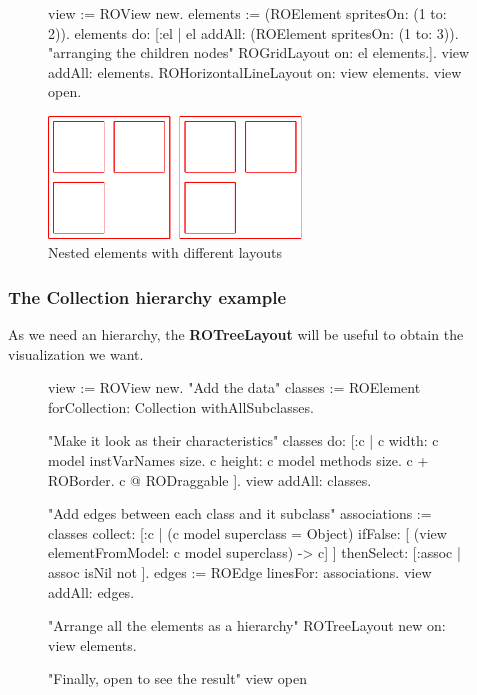 \documentclass[a4paper,10pt,twoside]{book}
\begin{document}
\begin{figure}[H]
      \begin{minipage}[t]{0.61\textwidth}
      \vspace{0pt}
     \begin{code}{}
view := ROView new.
elements := (ROElement spritesOn: (1 to: 2)).
elements 
	do: [:el | el addAll: (ROElement spritesOn: (1 to: 3)). 
	           "arranging the children nodes"
			   ROGridLayout on: el elements.].			   
view addAll: elements.
ROHorizontalLineLayout on: view elements.
view open.
  \end{code}
   \end{minipage}
   \hfill
   \begin{minipage}[t]{0.6\textwidth}
      \vspace{0pt} \raggedright
       \centering
		\includegraphics[width=0.6\textwidth]{nestedLayout}
   \end{minipage}
\label{fig:nestedLayout}
\caption{Nested elements with different layouts }
\end{figure} 

\subsubsection*{The Collection hierarchy example}
As we need an hierarchy, the \textbf{ROTreeLayout} will be useful to obtain the visualization we want.
\begin{figure}[H]
\begin{code}{}
view := ROView new.
"Add the data"
classes := ROElement forCollection: Collection withAllSubclasses.

"Make it look as their characteristics"
classes do: [:c | 
	c width: c model instVarNames size.
	c height: c model methods size.
	c + ROBorder. 
	c @ RODraggable ].
view addAll: classes.

"Add edges between each class and it subclass"
associations := classes collect: [:c | 
	(c model superclass = Object)
		ifFalse: [ (view elementFromModel: c model superclass) -> c]
	 ] thenSelect: [:assoc | assoc isNil not ].
edges := ROEdge linesFor: associations.
view addAll: edges.

"Arrange all the elements as a hierarchy"
ROTreeLayout new on: view elements.

"Finally, open to see the result"
view open
\end{code}
\end{figure}
\end{document}
